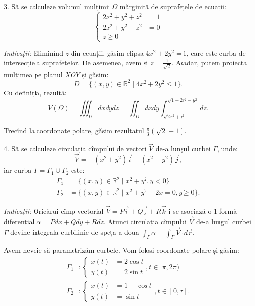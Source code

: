 \documentclass[11pt,a4paper]{article}
\newcommand\RR{\mathbb{R}}
\theoremstyle{dotless}
\theoremstyle{dotlessdr}
\begin{document}
3. Să se calculeze volumul mulțimii $\Omega$ mărginită de suprafețele de ecuații:
\[
  \begin{cases}
    2x^2 + y^2 + z^2 &= 1 \\
    2x^2 + y^2 - z^2 &= 0 \\
    z \geq 0
  \end{cases}
\]

\emph{Indicații:} Eliminînd $z$ din ecuații, găsim elipsa $4x^2 + 2y^2 = 1$, care
este curba de intersecție a suprafețelor. De asemenea, avem și $z = \frac{1}{\sqrt{2}}$.
Așadar, putem proiecta mulțimea pe planul $XOY$ și găsim:
\[
  D = \{ (x, y) \in \RR^2 \mid 4x^2 + 2y^2 \leq 1 \}.
\]
Cu definiția, rezultă:
\[
  V(\Omega) = \iiint_\Omega dx dy dz = \iint_D dxdy \int_{\sqrt{2x^2 + y^2}}^{\sqrt{1 - 2x^2 - y^2}} dz.
\]

Trecînd la coordonate polare, găsim rezultatul $\frac{\pi}{3} (\sqrt{2} - 1)$.

\vspace{1cm}

4. Să se calculeze circulația cîmpului de vectori $\vec{V}$ de-a lungul curbei $\Gamma$, unde:
\[
  \vec{V} = -(x^2 + y^2) \vec{i} - (x^2 - y^2)\vec{j},
\]
iar curba $\Gamma = \Gamma_1 \cup \Gamma_2$ este:
\begin{align*}
  \Gamma_1 &= \{(x, y) \in \RR^2 \mid x^2 + y^2, y < 0 \} \\
  \Gamma_2 &= \{(x, y) \in \RR^2 \mid x^2 + y^2 - 2x = 0, y \geq 0 \}.
\end{align*}

\emph{Indicații:} Oricărui cîmp vectorial $\vec{V} = P\vec{i} + Q\vec{j} + R\vec{k}$ i se asociază
o 1-formă diferențial $\alpha = Pdx + Qdy + Rdz$. Atunci circulația cîmpului $\vec{V}$ de-a lungul
curbei $\Gamma$ devine integrala curbilinie de speța a doua $\int_\Gamma \alpha = \int_\Gamma \vec{V} \cdot d\vec{r}$.

Avem nevoie să parametrizăm curbele. Vom folosi coordonate polare și găsim:
\begin{align*}
  \Gamma_1 &: \begin{cases}
    x(t) &= 2\cos t \\
    y(t) &= 2\sin t
  \end{cases}, t \in [\pi, 2\pi) \\
  \Gamma_2 &: \begin{cases}
    x(t) &= 1 + \cos t \\
    y(t) &= \sin t
  \end{cases}, t \in [0, \pi].
\end{align*}
\end{document}

